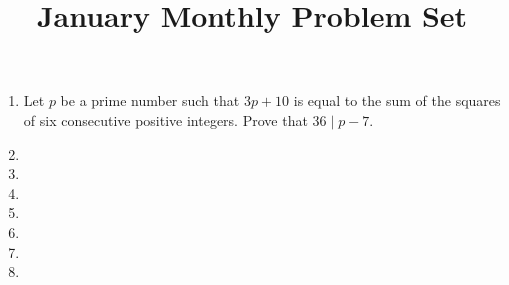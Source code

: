 \documentclass[12pt]{article}
\title{January Monthly Problem Set}
\begin{document}
 \maketitle

\begin{enumerate}

\item %
  Let $p$ be a prime number such that $3p+10$ is equal to the sum of the squares of six consecutive positive integers. Prove that $36 \mid p-7$.

 
\item %


\item %


\item %


\item %


\item %


\item %


\item %


\end{enumerate}

\vfill

\centering
\begin{BVerbatim}
\end{BVerbatim}
\end{document}
